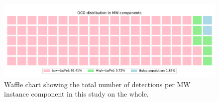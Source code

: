 \documentclass[journal, twocolumns]{IEEEtran}
\newcommand{\ecc}[1]{e_\text{#1}}
\begin{document}
	\begin{figure}[!h]%
		\centering
        \includegraphics[width=\columnwidth]{analysis_data/004__images_for_latex/dco_type_MW_distribution}
		\caption{Waffle chart showing the total number of detections per MW instance component in this study on the whole.}
		\label{fig:dcotypemwdistribution}
	\end{figure}%




%
\end{document}
